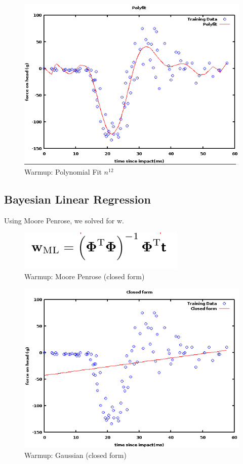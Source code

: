 \documentclass[11pt, oneside]{article}   	%
\begin{document}
\begin{figure}[h!] 
  \centering
  \includegraphics[scale=0.6]{polyfit}
  \caption{Warmup: Polynomial Fit $n^{12}$}
\end{figure}



\subsection*{Bayesian Linear Regression}

Using Moore Penrose, we solved for w.

\begin{figure}[h!] 
\centering
\includegraphics[scale=0.6]{moore_penrose}
\caption{Warmup: Moore Penrose (closed form)}
\end{figure}
 

\begin{figure}[h!] 
\centering
\includegraphics[scale=0.6]{closed_form}
\caption{Warmup: Gaussian (closed form)}
\end{figure}
\end{document}
